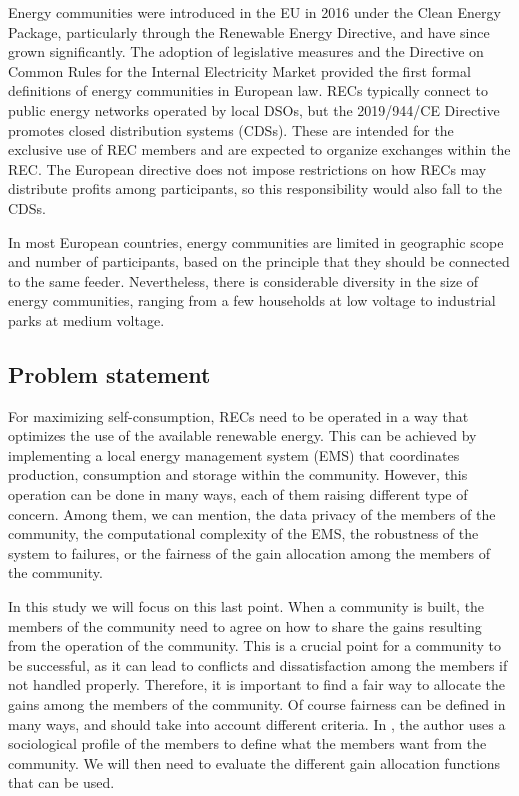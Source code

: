 Energy communities were introduced in the EU in 2016 under the Clean Energy Package, particularly through the Renewable Energy Directive, and have since grown significantly. The adoption of legislative measures and the Directive on Common Rules for the Internal Electricity Market provided the first formal definitions of energy communities in European law. RECs typically connect to public energy networks operated by local DSOs, but the 2019/944/CE Directive promotes closed distribution systems (CDSs). These are intended for the exclusive use of REC members and are expected to organize exchanges within the REC. The European directive does not impose restrictions on how RECs may distribute profits among participants, so this responsibility would also fall to the CDSs.

In most European countries, energy communities are limited in geographic scope and number of participants, based on the principle that they should be connected to the same feeder. Nevertheless, there is considerable diversity in the size of energy communities, ranging from a few households at low voltage to industrial parks at medium voltage.

\subsection{Problem statement}

For maximizing self-consumption, RECs need to be operated in a way that optimizes the use of the available renewable energy. This can be achieved by implementing a local energy management system (EMS) that coordinates production, consumption and storage within the community. However, this operation can be done in many ways, each of them raising different type of concern. Among them, we can mention, the data privacy of the members of the community, the computational complexity of the EMS, the robustness of the system to failures, or the fairness of the gain allocation among the members of the community. 

In this study we will focus on this last point. When a community is built, the members of the community need to agree on how to share the gains resulting from the operation of the community. This is a crucial point for a community to be successful, as it can lead to conflicts and dissatisfaction among the members if not handled properly. Therefore, it is important to find a fair way to allocate the gains among the members of the community. Of course fairness can be defined in many ways, and should take into account different criteria. In \cite{these_sorel}, the author uses a sociological profile of the members to define what the members want from the community. We will then need to evaluate the different gain allocation functions that can be used.

